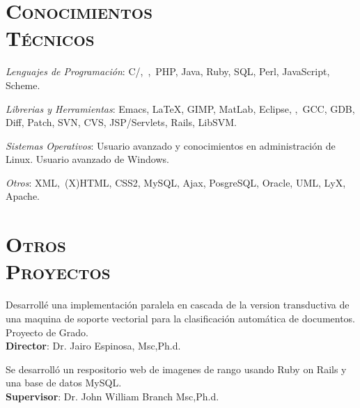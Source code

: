 \begin{resume}

\section{\textsc{Conocimientos\\ T\'{e}cnicos}}

\emph{Lenguajes de Programaci\'{o}n}: C/\Cplusplus,\ \CSharp,\ PHP, Java, Ruby, SQL, Perl, JavaScript, Scheme.

\emph{Librerias y Herramientas}: Emacs, \LaTeX, GIMP, MatLab, Eclipse, \GTKSharp,\ GCC, GDB, Diff, Patch, SVN, CVS, JSP/Servlets, Rails, LibSVM.

\emph{Sistemas Operativos}: Usuario avanzado y conocimientos en administraci\'{o}n de Linux. Usuario avanzado de Windows.

\emph{Otros}: XML,\ (X)HTML, CSS2, MySQL, Ajax, PosgreSQL, Oracle, UML, LyX, Apache.


\section{\textsc{Otros\\  Proyectos}}

\begin{position}
Desarroll\'{e} una implementaci\'{o}n  paralela en cascada de la version transductiva de una maquina de soporte vectorial
para la clasificaci\'{o}n autom\'{a}tica de documentos. Proyecto de Grado.\\
\textbf{Director}:  Dr. Jairo Espinosa, Msc,Ph.d.
\end{position}

\begin{position}
 Se desarroll\'{o} un respositorio web de imagenes de rango usando Ruby on Rails y una base de datos MySQL. \\
 \textbf{Supervisor}: Dr. John William Branch Msc,Ph.d.
\end{position}


\end{resume}
